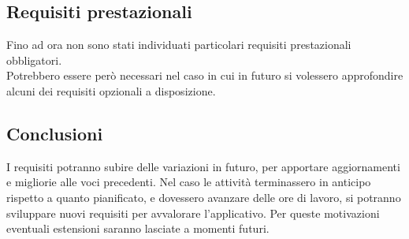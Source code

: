 \subsection{Requisiti prestazionali}
Fino ad ora non sono stati individuati particolari requisiti prestazionali obbligatori.\\
Potrebbero essere però necessari nel caso in cui in futuro si volessero approfondire alcuni dei requisiti opzionali a disposizione. 


\subsection{Conclusioni}
I requisiti potranno subire delle variazioni in futuro, per apportare aggiornamenti e migliorie alle voci precedenti.
Nel caso le attività terminassero in anticipo rispetto a quanto pianificato, e dovessero avanzare delle ore di lavoro, si potranno sviluppare nuovi
requisiti per avvalorare l'applicativo. Per queste motivazioni eventuali estensioni saranno lasciate a momenti futuri.